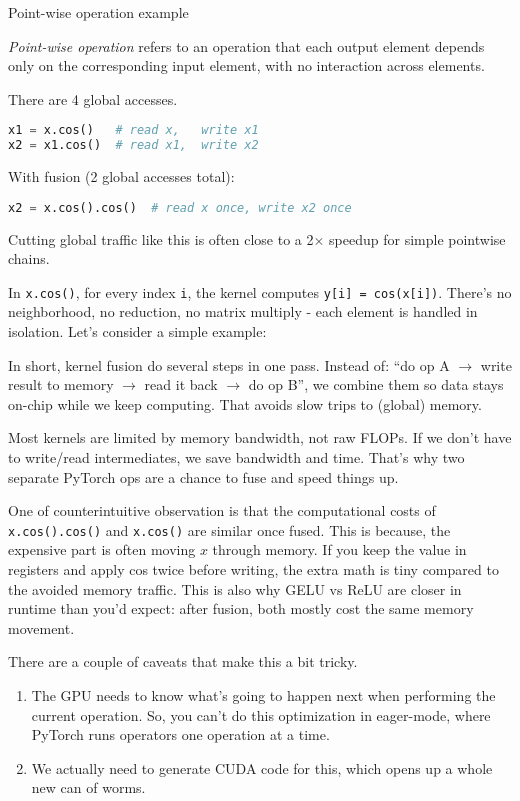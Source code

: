 \begin{commentbox}{Point-wise operation example}

\textit{Point-wise operation} refers to an operation that each output element depends only on the corresponding input element, with no interaction across elements.

There are 4 global accesses.
\begin{lstlisting}[language=Python]
x1 = x.cos()   # read x,   write x1
x2 = x1.cos()  # read x1,  write x2
\end{lstlisting}
With fusion (2 global accesses total):
\begin{lstlisting}[language=Python]
x2 = x.cos().cos()  # read x once, write x2 once
\end{lstlisting}
Cutting global traffic like this is often close to a 2$\times$ speedup for simple pointwise chains.

In \texttt{x.cos()}, for every index \texttt{i}, the kernel computes \texttt{y[i] = cos(x[i])}. There's no neighborhood, no reduction, no matrix multiply - each element is handled in isolation. Let's consider a simple example:
\end{commentbox}

In short, kernel fusion do several steps in one pass. Instead of: ``do op A $\to$ write result to memory $\to$ read it back $\to$ do op B'', we combine them so data stays on-chip while we keep computing. That avoids slow trips to (global) memory.

Most kernels are limited by memory bandwidth, not raw FLOPs. If we don't have to write/read intermediates, we save bandwidth and time. That's why two separate PyTorch ops are a chance to fuse and speed things up.

One of counterintuitive observation is that the computational costs of \texttt{x.cos().cos()} and \texttt{x.cos()} are similar once fused. This is because, the expensive part is often moving $x$ through memory. If you keep the value in registers and apply cos twice before writing, the extra math is tiny compared to the avoided memory traffic. This is also why GELU vs ReLU are closer in runtime than you'd expect: after fusion, both mostly cost the same memory movement.

There are a couple of caveats that make this a bit tricky. 
\begin{enumerate}
	\item The GPU needs to know what's going to happen next when performing the current operation. So, you can't do this optimization in eager-mode, where PyTorch runs operators one operation at a time. 
	\item We actually need to generate CUDA code for this, which opens up a whole new can of worms.
\end{enumerate}


